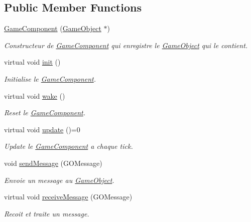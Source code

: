 \subsection*{Public Member Functions}
\begin{DoxyCompactItemize}
\item 
\hyperlink{class_game_component_a2323370728584eb85a822086605e0a09}{Game\+Component} (\hyperlink{class_game_object}{Game\+Object} $\ast$)
\begin{DoxyCompactList}\small\item\em Constructeur de \hyperlink{class_game_component}{Game\+Component} qui enregistre le \hyperlink{class_game_object}{Game\+Object} qui le contient. \end{DoxyCompactList}\item 
\hypertarget{class_game_component_ae602abc2eed3c565f410548aad7ee14e}{}\label{class_game_component_ae602abc2eed3c565f410548aad7ee14e} 
virtual void \hyperlink{class_game_component_ae602abc2eed3c565f410548aad7ee14e}{init} ()
\begin{DoxyCompactList}\small\item\em Initialise le \hyperlink{class_game_component}{Game\+Component}. \end{DoxyCompactList}\item 
\hypertarget{class_game_component_a3334ffc79f717357970abfbdb7eb4024}{}\label{class_game_component_a3334ffc79f717357970abfbdb7eb4024} 
virtual void \hyperlink{class_game_component_a3334ffc79f717357970abfbdb7eb4024}{wake} ()
\begin{DoxyCompactList}\small\item\em Reset le \hyperlink{class_game_component}{Game\+Component}. \end{DoxyCompactList}\item 
\hypertarget{class_game_component_a65fc004cd4dc7593052327ff874bb2f0}{}\label{class_game_component_a65fc004cd4dc7593052327ff874bb2f0} 
virtual void \hyperlink{class_game_component_a65fc004cd4dc7593052327ff874bb2f0}{update} ()=0
\begin{DoxyCompactList}\small\item\em Update le \hyperlink{class_game_component}{Game\+Component} a chaque tick. \end{DoxyCompactList}\item 
\hypertarget{class_game_component_a30bad20d9395895883bb75b998e9c974}{}\label{class_game_component_a30bad20d9395895883bb75b998e9c974} 
void \hyperlink{class_game_component_a30bad20d9395895883bb75b998e9c974}{send\+Message} (G\+O\+Message)
\begin{DoxyCompactList}\small\item\em Envoie un message au \hyperlink{class_game_object}{Game\+Object}. \end{DoxyCompactList}\item 
virtual void \hyperlink{class_game_component_a449c4a683e9bb42e0ab939a06e7b0640}{receive\+Message} (G\+O\+Message)
\begin{DoxyCompactList}\small\item\em Recoit et traite un message. \end{DoxyCompactList}\end{DoxyCompactItemize}
